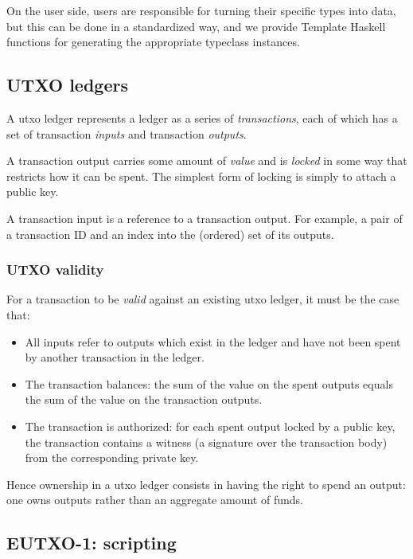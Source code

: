 On the user side, users are responsible for turning their specific types into \gls{data}, but this can be done in a standardized way, and we provide Template Haskell functions for generating the appropriate typeclass instances.

\subsection{UTXO ledgers}

A \gls{utxo} ledger represents a ledger as a series of \emph{transactions}, each of which has a set of transaction \emph{inputs} and transaction \emph{outputs}.

A transaction output carries some amount of \emph{value} and is \emph{locked} in some way that restricts how it can be spent.
The simplest form of locking is simply to attach a public key.

A transaction input is a reference to a transaction output.
For example, a pair of a transaction ID and an index into the (ordered) set of its outputs.

\subsubsection{UTXO validity}
\label{sec:utxo-valid}

For a transaction to be \emph{valid} against an existing \gls{utxo} ledger, it must be the case that:
\begin{itemize}
\item All inputs refer to outputs which exist in the ledger and have not been spent by another transaction in the ledger.
\item The transaction balances: the sum of the value on the spent outputs equals the sum of the value on the transaction outputs.
\item The transaction is authorized: for each spent output locked by a public key, the transaction contains a witness (a signature over the transaction body) from the corresponding private key.
\end{itemize}
\medskip

Hence ownership in a \gls{utxo} ledger consists in having the right to spend an output: one owns outputs rather than an aggregate amount of funds.

\subsection{EUTXO-1: scripting}
\label{sec:eutxo}

